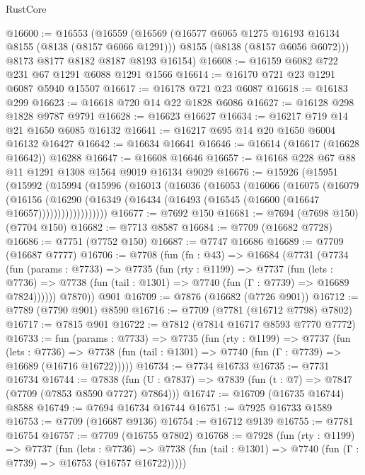 \begin{lexlean}{RustCore}
\begin{coremodule}
@16600 := @16553
    (@16559
      (@16569
        (@16577 @6065 @1275 @16193 @16134 @8155 (@8138 (@8157 @6066 @1291)))
        @8155
        (@8138 (@8157 @6056 @6072)))
      @8173
      @8177
      @8182
      @8187
      @8193
      @16154)
@16608 := @16159 @6082 @722 @231 @67 @1291 @6088 @1291 @1566
@16614 := @16170 @721 @23 @1291 @6087 @5940 @15507
@16617 := @16178 @721 @23 @6087
@16618 := @16183 @299
@16623 := @16618 @720 @14 @22 @1828 @6086
@16627 := @16128 @298 @1828 @9787 @9791
@16628 := @16623 @16627
@16634 := @16217 @719 @14 @21 @1650 @6085 @16132
@16641 := @16217 @695 @14 @20 @1650 @6004 @16132 @16427
@16642 := @16634 @16641
@16646 := @16614 (@16617 (@16628 @16642)) @16288
@16647 := @16608 @16646
@16657 := @16168 @228 @67 @88 @11 @1291 @1308 @1564 @9019 @16134 @9029
@16676 := @15926
    (@15951
      (@15992
        (@15994
          (@15996
            (@16013
              (@16036
                (@16053
                  (@16066
                    (@16075
                      (@16079
                        (@16156
                          (@16290
                            (@16349 (@16434 (@16493 (@16545 (@16600 (@16647 @16657))))))))))))))))))
@16677 := @7692 @150
@16681 := @7694 (@7698 @150) (@7704 @150)
@16682 := @7713 @8587
@16684 := @7709 (@16682 @7728)
@16686 := @7751 (@7752 @150)
@16687 := @7747 @16686
@16689 := @7709 (@16687 @7777)
@16706 := @7708
    (fun (fn : @43) =>
    @16684
      (@7731
        (@7734
          (fun (params : @7733) =>
          @7735
            (fun (rty : @1199) =>
            @7737
              (fun (lets : @7736) =>
              @7738 (fun (tail : @1301) => @7740 (fun (Γ : @7739) => @16689 @7824))))))
        @7870))
    @901
@16709 := @7876 (@16682 (@7726 @901))
@16712 := @7789 (@7790 @901) @8590
@16716 := @7709 (@7781 (@16712 @7798) @7802)
@16717 := @7815 @901
@16722 := @7812 (@7814 @16717 @8593 @7770 @7772)
@16733 := fun (params : @7733) =>
  @7735
    (fun (rty : @1199) =>
    @7737
      (fun (lets : @7736) =>
      @7738 (fun (tail : @1301) => @7740 (fun (Γ : @7739) => @16689 (@16716 @16722)))))
@16734 := @7734 @16733
@16735 := @7731 @16734
@16744 := @7838 (fun (U : @7837) => @7839 (fun (t : @7) => @7847 (@7709 (@7853 @8590 @7727) @7864)))
@16747 := @16709 (@16735 @16744) @8588
@16749 := @7694 @16734 @16744
@16751 := @7925 @16733 @1589
@16753 := @7709 (@16687 @9136)
@16754 := @16712 @9139
@16755 := @7781 @16754
@16757 := @7709 (@16755 @7802)
@16768 := @7928
    (fun (rty : @1199) =>
    @7737
      (fun (lets : @7736) =>
      @7738 (fun (tail : @1301) => @7740 (fun (Γ : @7739) => @16753 (@16757 @16722)))))

\end{coremodule}
\end{lexlean}
